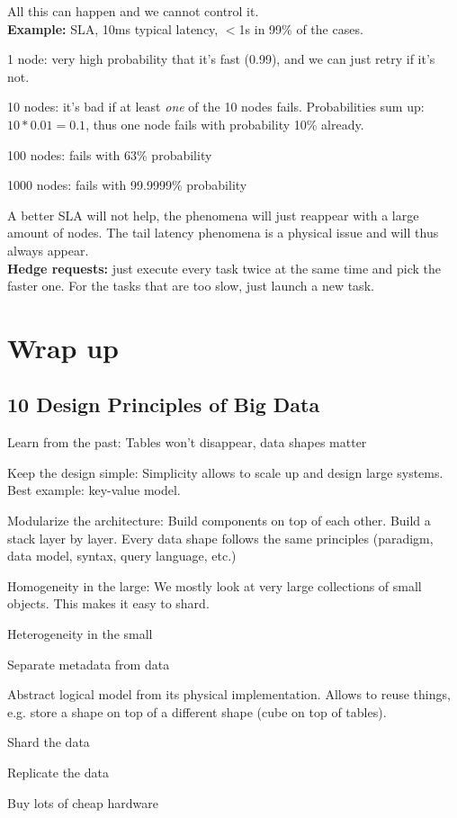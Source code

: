 \documentclass[11pt,oneside,a4paper]{article}
\begin{document}
{All this can happen and we cannot control it.\\

\textbf{Example:} SLA, 10ms typical latency, $<$1s in 99\% of the cases.

\begin{compactitem}
\item 1 node: very high probability that it's fast (0.99), and we can just retry if it's not.
\item 10 nodes: it's bad if at least \textit{one} of the 10 nodes fails. Probabilities sum up: $10*0.01 = 0.1$, thus one node fails with probability 10\% already.
\item 100 nodes: fails with 63\% probability
\item 1000 nodes: fails with 99.9999\% probability
\end{compactitem} 

A better SLA will not help, the phenomena will just reappear with a large amount of nodes. The tail latency phenomena is a physical issue and will thus always appear.\\

\textbf{Hedge requests:} just execute every task twice at the same time and pick the faster one. For the tasks that are too slow, just launch a new task.


\section{Wrap up}

\subsection{10 Design Principles of	Big Data}

\begin{compactenum}
\item Learn from the past: Tables won't disappear, data shapes matter
\item Keep the design simple: Simplicity allows to scale up and design large systems. Best example: key-value model.
\item Modularize the architecture: Build components on top of each other. Build a stack layer by layer. Every data shape follows the same principles (paradigm, data model, syntax, query language, etc.)
\item Homogeneity in the large: We mostly look at very large collections of small objects. This makes it easy to shard.
\item Heterogeneity in the small
\item Separate metadata from data
\item Abstract logical model from its physical implementation. Allows to reuse things, e.g. store a shape on top of a different shape (cube on top of tables).
\item Shard the data
\item Replicate the data
\item Buy lots of cheap hardware
\end{compactenum}

}
\end{document}
